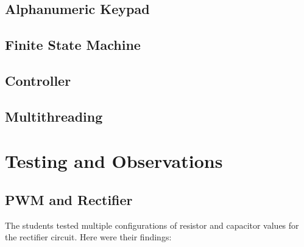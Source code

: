 \documentclass[12pt]{report}
\begin{document}
\subsection{Alphanumeric Keypad}


\subsection{Finite State Machine}


\subsection{Controller}

\subsection{Multithreading}

\section{Testing and Observations}

\subsection{PWM and Rectifier}\label{testpwm}

The students tested multiple configurations of resistor and capacitor values for the rectifier circuit. Here were their findings:
\end{document}
